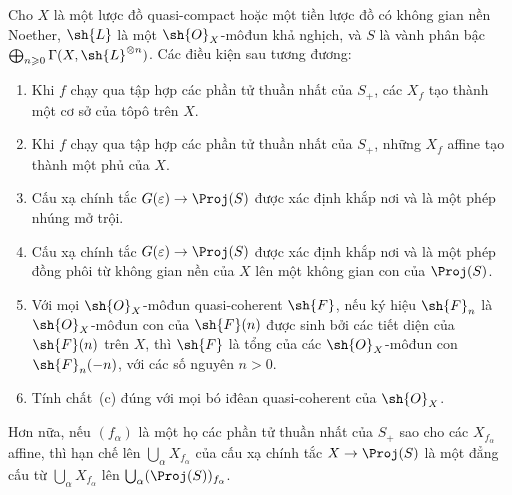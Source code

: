 \documentclass[oneside,10pt]{amsart}
\makeatletter
\renewcommand{\geq}{\geqslant}
\newcommand{\ega@arrow}[2]{\mathchoice{#1}{#2}{#2}{#2}}
\renewcommand{\to}{\ega@arrow{\longrightarrow}{\rightarrow}}
\newcommand{\oldpage}[2][]{\marginnote{\normalfont\footnotesize\textbf{#1}~|~#2}\ignorespaces}
\let\EGAOriginalLabel\label
\renewcommand{\label}[1]{\phantomsection\EGAOriginalLabel{#1}}
\makeatother
\begin{document}
\begin{theorem}[4.5.2]
\label{II.4.5.2}
Cho $X$ là một lược đồ quasi-compact hoặc một tiền lược đồ có không gian nền Noether, $\sh{L}$ là một $\sh{O}_X$-môđun khả nghịch, và $S$ là vành phân bậc $\bigoplus_{n\geq0}\Gamma(X,\sh{L}^{\otimes n})$.
Các điều kiện sau tương đương:
\begin{enumerate}
  \item[\rm{(a)}] Khi $f$ chạy qua tập hợp các phần tử thuần nhất của $S_+$, các $X_f$ tạo thành một cơ sở của tôpô trên $X$.
  \item[\rm{(a')}] Khi $f$ chạy qua tập hợp các phần tử thuần nhất của $S_+$, những $X_f$ affine tạo thành một phủ của $X$.
  \item[\rm{(b)}] Cấu xạ chính tắc $G(\varepsilon)\to\Proj(S)$  được xác định khắp nơi và là một phép nhúng mở trội.
\oldpage[II]{84}
  \item[\rm{(b')}] Cấu xạ chính tắc $G(\varepsilon)\to\Proj(S)$ được xác định khắp nơi và là một phép đồng phôi từ không gian nền của $X$ lên một không gian con của $\Proj(S)$.
  \item[\rm{(c)}] Với mọi $\sh{O}_X$-môđun quasi-coherent $\sh{F}$, nếu ký hiệu $\sh{F}_n$ là $\sh{O}_X$-môđun con của $\sh{F}(n)$ được sinh bởi các tiết diện của $\sh{F}(n)$ trên $X$, thì $\sh{F}$ là tổng của các $\sh{O}_X$-môđun con $\sh{F}_n(-n)$, với các số nguyên $n>0$.
  \item[\rm{(c')}] Tính chất~\rm{(c)} đúng với mọi bó iđêan quasi-coherent của $\sh{O}_X$.
\end{enumerate}

Hơn nữa, nếu $(f_\alpha)$ là một họ các phần tử thuần nhất của $S_+$ sao cho các $X_{f_\alpha}$ affine, thì hạn chế lên $\bigcup_\alpha X_{f_\alpha}$ của cấu xạ chính tắc $X\to\Proj(S)$ là một đẳng cấu từ $\bigcup_\alpha X_{f_\alpha}$ lên $\bigcup_\alpha(\Proj(S))_{f_\alpha}$.
\end{theorem}
\end{document}
